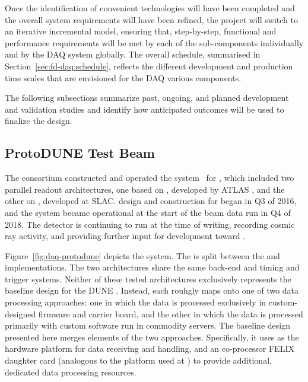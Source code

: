 Once the identification of convenient technologies will have been completed and the overall system requirements will have been refined, the project will switch to an iterative incremental model, ensuring that, step-by-step, functional and performance requirements will be met by each of the sub-components individually and by the DAQ system globally.
The overall schedule, summarised in Section~\ref{sec:fd-daq:schedule}, reflects the different development and production time scales that are envisioned for the DAQ various components.


The following subsections summarize past, ongoing, and planned
development and validation studies and identify how anticipated outcomes
will be used to finalize the  design.

\subsection{ProtoDUNE Test Beam}

\label{sec:fd-daq:protodune}

The   consortium constructed and operated the  system~\cite{Sipos:2018auh} for , which included two parallel  readout architectures, one based on , developed by ATLAS \cite{atlas-felix}, and the other on , developed at SLAC.  design and construction for  began in Q3 of 2016, and the system became operational at the start of the beam data run in Q4 of 2018. The detector is continuing to run at the time of writing, recording cosmic ray activity, and providing further input for  development toward . 

Figure~\ref{fig:daq-protodune} depicts the   system. 
The  is split between the  and  implementations. The two architectures share the same back-end and timing and trigger systems. 
Neither of these tested architectures exclusively represents the baseline design for the DUNE . Instead, each rouhgly maps onto one of two data processing approaches: one in which the data is processed exclusively in custom-designed  firmware and carrier board, and the other in which the data is processed primarily with custom software run in commodity servers. The baseline design presented here merges elements of the two approaches. Specifically, it uses  as the hardware platform for data receiving and handling, and an co-processor FELIX daughter card (analogous to the  platform used at ) to provide additional, dedicated data processing resources.


